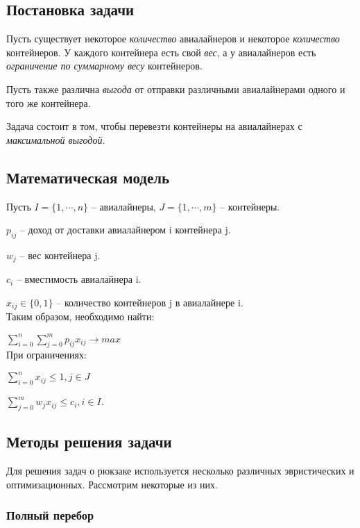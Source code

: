 \documentclass[14pt,a4paper]{extarticle}
\begin{document}
\subsection{Постановка задачи}

	Пусть существует некоторое \emph{количество} авиалайнеров и некоторое \emph{количество} контейнеров. У каждого контейнера есть свой \emph{вес}, а у авиалайнеров есть \emph{ограничение по суммарному весу} контейнеров.
	
	Пусть также различна \emph{выгода} от отправки различными авиалайнерами одного и того же контейнера.
	
	Задача состоит в том, чтобы перевезти контейнеры на авиалайнерах с \emph{максимальной выгодой}. 

\subsection{Математическая модель}

	Пусть $I = \{1,\cdots, n\}$ -- авиалайнеры, $J = \{1,\cdots, m\}$ -- контейнеры.
	
	$p_{ij}$ -- доход от доставки авиалайнером i контейнера j.
	
	$w_{j}$ -- вес контейнера j.
	
	$c_{i}$ -- вместимость авиалайнера i.
	
	$x_{ij} \in \{0,1\}$ -- количество контейнеров j в авиалайнере i.
	\\
	Таким образом, необходимо найти:
	
	$\sum\limits_{i=0}^{n}\sum\limits_{j=0}^{m}p_{ij}x_{ij} \to max$
	\\
	При ограничениях: 
	
	$\sum\limits_{i=0}^{n}x_{ij} \le 1, j \in J$
	
	
	$\sum\limits_{j=0}^{m}w_{j}x_{ij} \le c_{i}, i \in I$.


\subsection{Методы решения задачи}

	Для решения задач о рюкзаке используется несколько различных эвристических и оптимизационных. Рассмотрим некоторые из них.
	
	\subsubsection{Полный перебор}
	
\end{document}
